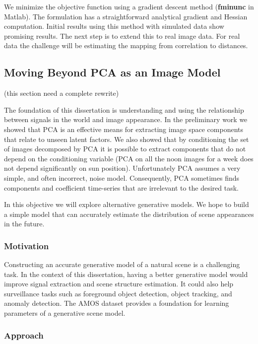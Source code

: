 We minimize the objective function using a gradient descent method
(\textbf{fminunc} in Matlab).  The formulation has a straightforward
analytical gradient and Hessian computation.  Initial results using
this method with simulated data show promising results.  The next step
is to extend this to real image data.  For real data the challenge
will be estimating the mapping from correlation to distances.

%
%
%
\subsection{Moving Beyond PCA as an Image Model}
\label{sec:generative}

(this section need a complete rewrite)

The foundation of this dissertation is understanding and using the
relationship between signals in the world and image appearance. In the
preliminary work we showed that PCA is an effective means for
extracting image space components that relate to unseen latent
factors.  We also showed that by conditioning the set of images
decomposed by PCA it is possible to extract components that do not
depend on the conditioning variable (\eg PCA on all the noon images
for a week does not depend significantly on sun position).
Unfortunately PCA assumes a very simple, and often incorrect, noise
model.  Consequently, PCA sometimes finds components and coefficient
time-series that are irrelevant to the desired task.

In this objective we will explore alternative generative models.  We
hope to build a simple model that can accurately estimate the
distribution of scene appearances in the future.

\subsubsection{Motivation}

Constructing an accurate generative model of a natural scene is a
challenging task.  In the context of this dissertation, having a
better generative model would improve signal extraction and scene
structure estimation.  It could also help surveillance tasks such as
foreground object detection, object tracking, and anomaly detection.
The AMOS dataset provides a foundation for learning parameters of a
generative scene model.

\subsubsection{Approach}

